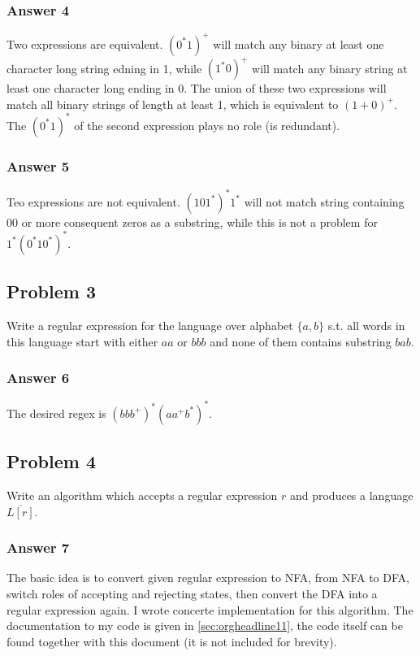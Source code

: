 \documentclass[11pt]{article}
\begin{document}
\subsubsection{Answer 4}
\label{sec:orgheadline6}
Two expressions are equivalent.  \((0^*1)^+\) will match any binary at least
one character long string edning in 1, while \((1^*0)^+\) will match any
binary string at least one character long ending in 0.  The union of these
two expressions will match all binary strings of length at least 1, which is
equivalent to \((1+0)^+\).  The \((0^*1)^*\) of the second expression plays no
role (is redundant).

\subsubsection{Answer 5}
\label{sec:orgheadline7}
Teo expressions are not equivalent.  \((101^*)^*1^*\) will not match string
containing 00 or more consequent zeros as a substring, while this is not a
problem for \(1^*(0^*10^*)^*\).

\subsection{Problem 3}
\label{sec:orgheadline10}
Write a regular expression for the language over alphabet \(\{a,b\}\) s.t. all
words in this language start with either \(aa\) or \(bbb\) and none of them
contains substring \(bab\).

\subsubsection{Answer 6}
\label{sec:orgheadline9}
The desired regex is \((bbb^+)^*(aa^+b^*)^*\).

\subsection{Problem 4}
\label{sec:orgheadline13}
Write an algorithm which accepts a regular expression \(r\) and produces a
language \(\overline{L[r]}\).

\subsubsection{Answer 7}
\label{sec:orgheadline12}
The basic idea is to convert given regular expression to NFA, from NFA to
DFA, switch roles of accepting and rejecting states, then convert the DFA
into a regular expression again.  I wrote concerte implementation for this
algorithm.  The documentation to my code is given in \ref{sec:orgheadline11}, the code
itself can be found together with this document (it is not included for
brevity).
\end{document}
